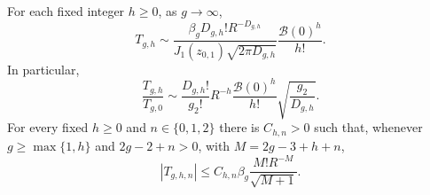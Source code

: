 \begin{prp}\label{prp:s08:intersections}
For each fixed integer $h\geq0$, as $g\to\infty$,
\begin{equation}\label{eq:s08:intersection-asymptotic}
 T_{g,h}\sim
 \frac{\beta_g D_{g,h}!R^{-D_{g,h}}}
      {J_1(z_{0,1})\sqrt{2\pi D_{g,h}}}
                       \frac{\mathcal B(0)^h}{h!}.
\end{equation}
In particular,
\begin{equation}\label{eq:s08:intersection-ratio}
 \frac{T_{g,h}}{T_{g,0}}
 \sim\frac{D_{g,h}!}{g_2!}R^{-h}
             \frac{\mathcal B(0)^h}{h!}
             \sqrt{\frac{g_2}{D_{g,h}}}.
\end{equation}
For every fixed $h\geq0$ and $n\in\{0,1,2\}$ there is $C_{h,n}>0$
such that, whenever $g\geq\max\{1,h\}$ and $2g-2+n>0$,
with $M=2g-3+h+n$,
\begin{equation}\label{eq:s08:marked-bound}
 |T_{g,h,n}|\leq C_{h,n}\beta_g
                          \frac{M!R^{-M}}{\sqrt{M+1}}.
\end{equation}
\end{prp}
